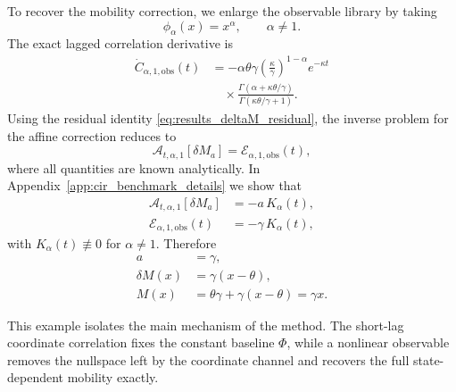 \documentclass[11pt,twoside,fleqn]{article}
\begin{document}
To recover the mobility correction, we enlarge the observable library by taking
\begin{equation}
    \phi_\alpha(x)=x^\alpha,
    \qquad \alpha\neq 1.
    \label{eq:cir_power_observables_results}
\end{equation}
The exact lagged correlation derivative is
\begin{equation}
\begin{aligned}
    \dot C_{\alpha,1,\mathrm{obs}}(t)
    &=
    -\alpha\theta\gamma
    \left(\frac{\kappa}{\gamma}\right)^{1-\alpha}
    e^{-\kappa t}
    \\
    &\quad\times
    \frac{
        \Gamma(\alpha+\kappa\theta/\gamma)
    }{
        \Gamma(\kappa\theta/\gamma+1)
    }.
\end{aligned}
    \label{eq:cir_exact_correlation_derivative_results}
\end{equation}
Using the residual identity \eqref{eq:results_deltaM_residual}, the inverse problem for the affine correction reduces to
\begin{equation}
    \mathcal{A}_{t,\alpha,1}[\delta M_a]
    =
    \mathcal{E}_{\alpha,1,\mathrm{obs}}(t),
    \label{eq:cir_affine_inverse_problem_results}
\end{equation}
where all quantities are known analytically. In Appendix~\ref{app:cir_benchmark_details} we show that
\begin{equation}
\begin{aligned}
    \mathcal{A}_{t,\alpha,1}[\delta M_a]
    &=
    -a\,K_\alpha(t),
    \\
    \mathcal{E}_{\alpha,1,\mathrm{obs}}(t)
    &=
    -\gamma\,K_\alpha(t),
\end{aligned}
    \label{eq:cir_affine_exact_reduction_results}
\end{equation}
with \(K_\alpha(t)\not\equiv 0\) for \(\alpha\neq 1\). Therefore
\begin{equation}
\begin{aligned}
    a&=\gamma,
    \\
    \delta M(x)&=\gamma(x-\theta),
    \\
    M(x)&=\theta\gamma+\gamma(x-\theta)=\gamma x.
\end{aligned}
    \label{eq:cir_exact_mobility_recovery_results}
\end{equation}

This example isolates the main mechanism of the method. The short-lag coordinate correlation fixes the constant baseline \(\Phi\), while a nonlinear observable removes the nullspace left by the coordinate channel and recovers the full state-dependent mobility exactly.
\end{document}
